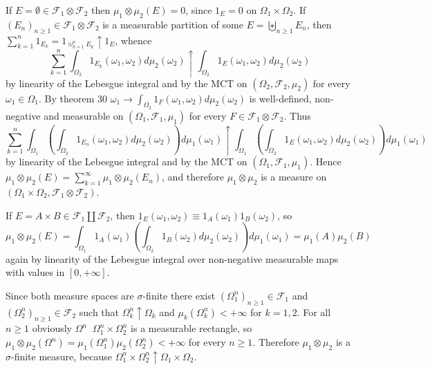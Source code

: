 \documentclass[a4paper]{article}
\newcommand{\clo}[1]{\left [ #1 \right ]}
\newcommand{\brac}[1]{\left ( #1 \right )}
\newcommand{\Zinf}{\clo{ 0, +\infty }}
\newcommand{\Fcal}{\mathcal{F}}
\newcommand{\defn}{\mathop{\overset{\Delta}{=}}\nolimits}
\begin{document}
If $E = \emptyset\in \Fcal_1\otimes \Fcal_2$ then $\mu_1\otimes\mu_2\brac{E} = 0$, since $1_E = 0$ on $\Omega_1\times \Omega_2$. If $\brac{E_n}_{n\geq 1}\in \Fcal_1\otimes \Fcal_2$ is a measurable partition of some $E = \biguplus_{n\geq 1} E_n$, then $\sum_{k=1}^n 1_{E_k} = 1_{\uplus_{k=1}^n E_k}\uparrow 1_E$, whence \[\sum_{k=1}^n \int_{\Omega_2}1_{E_k}\brac{\omega_1, \omega_2} d\mu_2\brac{\omega_2}\uparrow \int_{\Omega_2}1_E\brac{\omega_1, \omega_2} d\mu_2\brac{\omega_2}\] by linearity of the Lebesgue integral and by the MCT on $\brac{\Omega_2, \Fcal_2, \mu_2}$ for every $\omega_1\in \Omega_1$. By theorem 30 $\omega_1\to\int_{\Omega_2}1_F\brac{\omega_1, \omega_2} d\mu_2\brac{\omega_2}$ is well-defined, non-negative and measurable on $\brac{\Omega_1, \Fcal_1, \mu_1}$ for every $F\in \Fcal_1\otimes \Fcal_2$. Thus \[\sum_{k=1}^n \int_{\Omega_1}\brac{ \int_{\Omega_2}1_{E_n}\brac{\omega_1, \omega_2} d\mu_2\brac{\omega_2} } d\mu_1\brac{\omega_1}\uparrow \int_{\Omega_1}\brac{ \int_{\Omega_2}1_E\brac{\omega_1, \omega_2} d\mu_2\brac{\omega_2} } d\mu_1\brac{\omega_1}\] by linearity of the Lebesgue integral and by the MCT on $\brac{\Omega_1, \Fcal_1, \mu_1}$. Hence $\mu_1\otimes\mu_2\brac{E} = \sum_{k=1}^\infty \mu_1\otimes\mu_2\brac{E_n}$, and therefore $\mu_1\otimes\mu_2$ is a measure on $\brac{\Omega_1\times \Omega_2, \Fcal_1\otimes \Fcal_2}$.

If $E = A\times B\in \Fcal_1 \coprod \Fcal_2$, then $1_E \brac{\omega_1, \omega_2} \equiv 1_A \brac{\omega_1} 1_B \brac{\omega_2}$, so \[\mu_1\otimes\mu_2\brac{E} = \int_{\Omega_1} 1_A\brac{\omega_1} \brac{ \int_{\Omega_2} 1_B\brac{\omega_2} d\mu_2\brac{\omega_2} } d\mu_1\brac{\omega_1} = \mu_1\brac{A} \mu_2\brac{B}\] again by linearity of the Lebesgue integral over non-negative measurable maps with values in $\Zinf$.

Since both measure spaces are $\sigma$-finite there exist $\brac{\Omega_1^n}_{n\geq 1}\in \Fcal_1$ and $\brac{\Omega_2^n}_{n\geq 1}\in \Fcal_2$ such that $\Omega_k^n\uparrow \Omega_k$ and $\mu_k\brac{\Omega_k^n}< +\infty$ for $k=1,2$. For all $n\geq 1$ obviously $\Omega^n \defn \Omega_1^n \times \Omega_2^n$ is a measurable rectangle, so $\mu_1\otimes\mu_2\brac{\Omega^n} = \mu_1\brac{\Omega_1^n}\mu_2\brac{\Omega_2^n} < +\infty$ for every $n\geq 1$. Therefore $\mu_1\otimes\mu_2$ is a $\sigma$-finite measure, because $\Omega_1^n\times \Omega_2^n\uparrow \Omega_1\times \Omega_2$.
\end{document}
